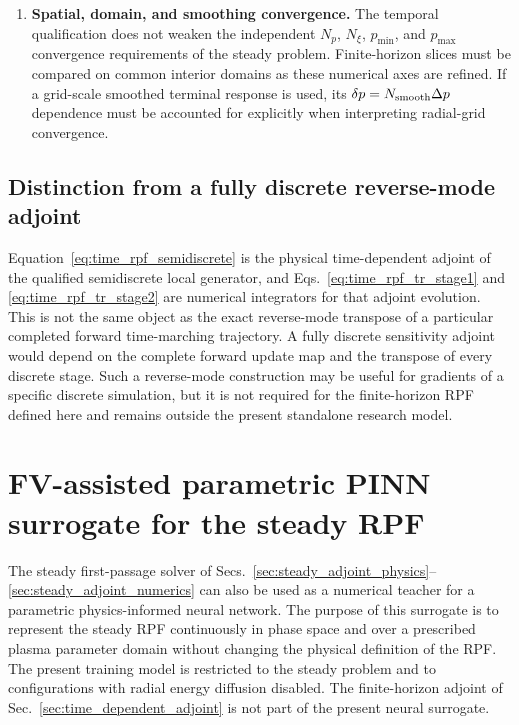 \documentclass[11pt]{article}
\begin{document}
\begin{enumerate}
 \item \textbf{Spatial, domain, and smoothing convergence.}  The temporal qualification does
       not weaken the independent $N_p$, $N_\xi$, $p_{\min}$, and $p_{\max}$ convergence
       requirements of the steady problem.  Finite-horizon slices must be compared on common
       interior domains as these numerical axes are refined.  If a grid-scale smoothed terminal
       response is used, its $\delta p=N_{\rm smooth}\Delta p$ dependence must be accounted for
       explicitly when interpreting radial-grid convergence.
\end{enumerate}

\subsection{Distinction from a fully discrete reverse-mode adjoint}
\label{sec:time_adjoint_discrete_scope}

Equation~\eqref{eq:time_rpf_semidiscrete} is the physical time-dependent adjoint of the
qualified semidiscrete local generator, and Eqs.~\eqref{eq:time_rpf_tr_stage1} and
\eqref{eq:time_rpf_tr_stage2} are numerical integrators for that adjoint evolution.  This is
not the same object as the exact reverse-mode transpose of a particular completed forward
time-marching trajectory.  A fully discrete sensitivity adjoint would depend on the complete
forward update map and the transpose of every discrete stage.  Such a reverse-mode construction
may be useful for gradients of a specific discrete simulation, but it is not required for the
finite-horizon RPF defined here and remains outside the present standalone research model.



\section{FV-assisted parametric PINN surrogate for the steady RPF}
\label{sec:fv_assisted_pinn}

The steady first-passage solver of Secs.~\ref{sec:steady_adjoint_physics}--
\ref{sec:steady_adjoint_numerics} can also be used as a numerical teacher for a
parametric physics-informed neural network.  The purpose of this surrogate is to
represent the steady RPF continuously in phase space and over a prescribed plasma
parameter domain without changing the physical definition of the RPF.  The present
training model is restricted to the steady problem and to configurations with radial
energy diffusion disabled.  The finite-horizon adjoint of Sec.~\ref{sec:time_dependent_adjoint}
is not part of the present neural surrogate.
\end{document}
